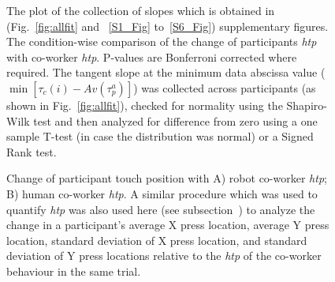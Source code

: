 \begin{figure}[hpbt]
	\caption{The plot of the collection of slopes which is obtained in (Fig.~\ref{fig:allfit} and ~\ref{S1_Fig} to~\ref{S6_Fig}) supplementary figures. The condition-wise comparison of the change of participants {\it htp} with co-worker {\it htp}. P-values are Bonferroni corrected where required. The tangent slope at the minimum data abscissa value ($\min[\tau_c(i)-Av(\tau_p^a)]$) was collected across participants (as shown in Fig.~\ref{fig:allfit}), checked for normality using the Shapiro-Wilk test and then analyzed for difference from zero using a one sample T-test (in case the distribution was normal) or a Signed Rank test.}
	\label{fig:slope_allcond}
\end{figure}


\begin{figure}[hpbt]
	\caption{Change of participant touch position with A) robot co-worker {\it htp}; B) human co-worker {\it htp}. A similar procedure which was used to quantify {\it htp} was also used here (see subsection~) to analyze the change in a participant's average X press location, average Y press location, standard deviation of X press location, and standard deviation of Y press locations relative to the {\it htp} of the co-worker behaviour in the same trial.}
	\label{fig:variance}
\end{figure}


